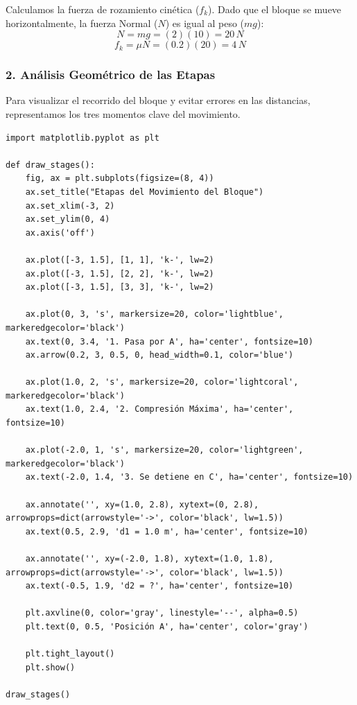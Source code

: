 \documentclass[12pt, a4paper]{article}
\begin{document}
Calculamos la fuerza de rozamiento cinética ($f_k$). Dado que el bloque se mueve horizontalmente, la fuerza Normal ($N$) es igual al peso ($mg$):
$$ N = mg = (2)(10) = 20 \, \si{N} $$
$$ f_k = \mu N = (0.2)(20) = 4 \, \si{N} $$

\subsubsection*{2. Análisis Geométrico de las Etapas}
Para visualizar el recorrido del bloque y evitar errores en las distancias, representamos los tres momentos clave del movimiento.

\begin{lstlisting}
import matplotlib.pyplot as plt

def draw_stages():
    fig, ax = plt.subplots(figsize=(8, 4))
    ax.set_title("Etapas del Movimiento del Bloque")
    ax.set_xlim(-3, 2)
    ax.set_ylim(0, 4)
    ax.axis('off')
    
    ax.plot([-3, 1.5], [1, 1], 'k-', lw=2)
    ax.plot([-3, 1.5], [2, 2], 'k-', lw=2)
    ax.plot([-3, 1.5], [3, 3], 'k-', lw=2)
    
    ax.plot(0, 3, 's', markersize=20, color='lightblue', markeredgecolor='black')
    ax.text(0, 3.4, '1. Pasa por A', ha='center', fontsize=10)
    ax.arrow(0.2, 3, 0.5, 0, head_width=0.1, color='blue')
    
    ax.plot(1.0, 2, 's', markersize=20, color='lightcoral', markeredgecolor='black')
    ax.text(1.0, 2.4, '2. Compresión Máxima', ha='center', fontsize=10)
    
    ax.plot(-2.0, 1, 's', markersize=20, color='lightgreen', markeredgecolor='black')
    ax.text(-2.0, 1.4, '3. Se detiene en C', ha='center', fontsize=10)
    
    ax.annotate('', xy=(1.0, 2.8), xytext=(0, 2.8), arrowprops=dict(arrowstyle='->', color='black', lw=1.5))
    ax.text(0.5, 2.9, 'd1 = 1.0 m', ha='center', fontsize=10)
    
    ax.annotate('', xy=(-2.0, 1.8), xytext=(1.0, 1.8), arrowprops=dict(arrowstyle='->', color='black', lw=1.5))
    ax.text(-0.5, 1.9, 'd2 = ?', ha='center', fontsize=10)
    
    plt.axvline(0, color='gray', linestyle='--', alpha=0.5)
    plt.text(0, 0.5, 'Posición A', ha='center', color='gray')

    plt.tight_layout()
    plt.show()

draw_stages()
\end{lstlisting}
\end{document}
